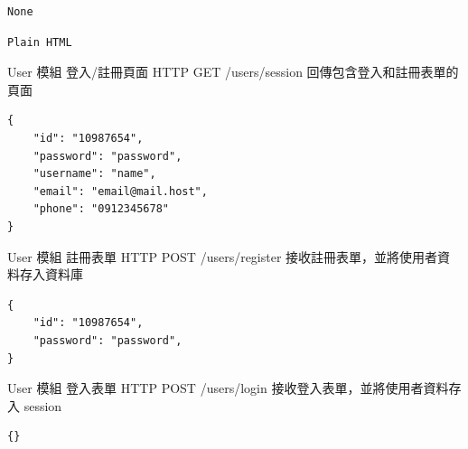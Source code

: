 \documentclass{article}
\begin{document}
\begin{lrbox}{\jsoninputbox}
	\begin{lstlisting}
None
\end{lstlisting}
\end{lrbox}

\begin{lrbox}{\jsonoutputbox}
	\begin{lstlisting}
Plain HTML
\end{lstlisting}
\end{lrbox}

{User 模組}
{登入/註冊頁面}
{HTTP GET}
{/users/session}
{回傳包含登入和註冊表單的頁面}

\bigskip

\begin{lrbox}{\jsoninputbox}
	\begin{lstlisting}[basicstyle=\tiny\ttfamily]
{
	"id": "10987654",
	"password": "password",
	"username": "name",
	"email": "email@mail.host",
	"phone": "0912345678"
}
\end{lstlisting}
\end{lrbox}

\begin{lrbox}{\jsonoutputbox}
\end{lrbox}

{User 模組}
{註冊表單}
{HTTP POST}
{/users/register}
{接收註冊表單，並將使用者資料存入資料庫}

\bigskip

\begin{lrbox}{\jsoninputbox}
	\begin{lstlisting}[basicstyle=\tiny\ttfamily]
{
	"id": "10987654",
	"password": "password",
}

\end{lstlisting}
\end{lrbox}

\begin{lrbox}{\jsonoutputbox}
\end{lrbox}

{User 模組}
{登入表單}
{HTTP POST}
{/users/login}
{接收登入表單，並將使用者資料存入 session}

\bigskip

\begin{lrbox}{\jsoninputbox}
	\begin{lstlisting}
{}
\end{lstlisting}
\end{lrbox}
\end{document}
